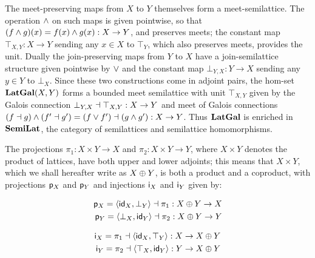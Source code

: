 The meet-preserving maps from $X$ to $Y$ themselves form a meet-semilattice. The operation $\wedge$ on such
maps is given pointwise, so that $(f \wedge g)(x) = f(x) \wedge g(x): X \to Y$, and preserves meets; the
constant map $\top_{X,Y}: X \to Y$ sending any $x \in X$ to $\top_Y$, which also preserves meets, provides the
unit. Dually the join-preserving maps from $Y$ to $X$ have a join-semilattice structure given pointwise by
$\vee$ and the constant map $\bot_{Y,X}: Y \to X$ sending any $y \in Y$ to $\bot_X$. Since these two
constructions come in adjoint pairs, the hom-set $\mathbf{LatGal}(X,Y)$ forms a bounded meet semilattice with unit
$\top_{X,Y}$ given by the Galois connection $\bot_{Y,X} \dashv \top_{X,Y}: X \to Y$ and meet of Galois
connections $(f \dashv g) \wedge (f' \dashv g') = (f \vee f') \dashv (g \wedge g'): X \to Y$. Thus $\mathbf{LatGal}$ is
enriched in $\mathbf{SemiLat}$, the category of semilattices and semilattice homomorphisms.

The projections $\pi_1: X \times Y \to X$ and $\pi_2: X \times Y \to Y$, where $X \times Y$ denotes the
product of lattices, have both upper and lower adjoints; this means that $X \times Y$, which we shall
hereafter write as $X \oplus Y$, is both a product and a coproduct, with projections $\mathsf{p}_X$ and
$\mathsf{p}_Y$ and injections $\mathsf{i}_X$ and $\mathsf{i}_Y$ given by:

\vspace{-4mm}
\begin{minipage}[t]{0.45\textwidth}
\begin{center}
\begin{align*}
   \mathsf{p}_X = \langle \mathsf{id}_X, \bot_Y\rangle \dashv \pi_1: X \oplus Y \to X \\
   \mathsf{p}_Y = \langle \bot_X, \mathsf{id}_Y\rangle \dashv \pi_2: X \oplus Y \to Y
\end{align*}
\end{center}
\end{minipage}%
\begin{minipage}[t]{0.45\textwidth}
\begin{center}
\begin{align*}
   \mathsf{i}_X = \pi_1 \dashv \langle \mathsf{id}_X, \top_Y\rangle : X \to X \oplus Y \\
   \mathsf{i}_Y = \pi_2 \dashv \langle \top_X, \mathsf{id}_Y\rangle: Y \to X \oplus Y
\end{align*}
\end{center}
\end{minipage}
\vspace{2mm}

